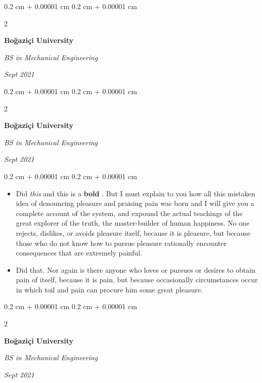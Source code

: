 \documentclass[10pt, letterpaper]{article}
\newenvironment{highlights}{
    \begin{itemize}[
        topsep=0.10 cm,
        parsep=0.10 cm,
        partopsep=0pt,
        itemsep=0pt,
        leftmargin=0.4 cm + 10pt
    ]
}{
    \end{itemize}
} %
\newenvironment{onecolentry}{
    \begin{adjustwidth}{
        0.2 cm + 0.00001 cm
    }{
        0.2 cm + 0.00001 cm
    }
}{
    \end{adjustwidth}
} %
\newenvironment{twocolentry}[2][]{
    \onecolentry
    \def\secondColumn{#2}
    \setcolumnwidth{\fill, 4.5 cm}
    \begin{paracol}{2}
}{
    \switchcolumn \raggedleft \secondColumn
    \end{paracol}
    \endonecolentry
} %
\let\hrefWithoutArrow\href
\renewcommand{\href}[2]{\hrefWithoutArrow{#1}{\ifthenelse{\equal{#2}{}}{ }{#2 }\raisebox{.15ex}{\footnotesize \faExternalLink*}}}
\begin{document}
        \vspace{0.2 cm}

        \begin{twocolentry}{
            
            
        \textit{Sept 2021}}
            \textbf{Boğaziçi University}

            \textit{BS in Mechanical Engineering}
        \end{twocolentry}



        \vspace{0.2 cm}

        \begin{twocolentry}{
            
            
        \textit{Sept 2021}}
            \textbf{Boğaziçi University}

            \textit{BS in Mechanical Engineering}
        \end{twocolentry}

        \vspace{0.10 cm}
        \begin{onecolentry}
            \begin{highlights}
                \item Did \textit{this} and this is a \textbf{bold} \href{https://example.com}{link}. But I must explain to you how all this mistaken idea of denouncing pleasure and praising pain was born and I will give you a complete account of the system, and expound the actual teachings of the great explorer of the truth, the master-builder of human happiness. No one rejects, dislikes, or avoids pleasure itself, because it is pleasure, but because those who do not know how to pursue pleasure rationally encounter consequences that are extremely painful.
                \item Did that. Nor again is there anyone who loves or pursues or desires to obtain pain of itself, because it is pain, but because occasionally circumstances occur in which toil and pain can procure him some great pleasure.
            \end{highlights}
        \end{onecolentry}


        \vspace{0.2 cm}

        \begin{twocolentry}{
            
            
        \textit{Sept 2021}}
            \textbf{Boğaziçi University}

            \textit{BS in Mechanical Engineering}
        \end{twocolentry}
\end{document}
